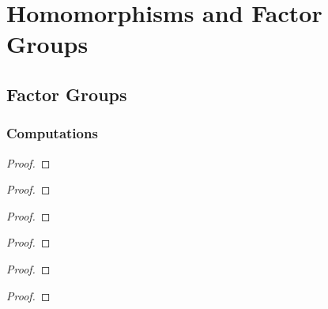\chapter{Homomorphisms and Factor Groups}

\section{Factor Groups}

\subsection*{Computations}

\begin{exercise}
\end{exercise}

\begin{proof}
\end{proof}

\begin{exercise}
\end{exercise}

\begin{proof}
\end{proof}

\begin{exercise}
\end{exercise}

\begin{proof}
\end{proof}

\begin{exercise}
\end{exercise}

\begin{proof}
\end{proof}

\begin{exercise}
\end{exercise}

\begin{proof}
\end{proof}

\begin{exercise}
\end{exercise}

\begin{proof}
\end{proof}

